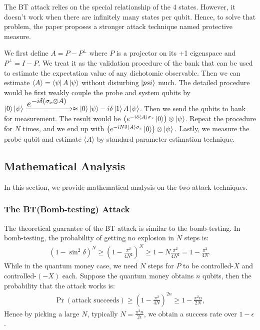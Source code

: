 \documentclass{article} %
\begin{document}
The BT attack relies on the special relationship of the 4 states. However, it doesn't work when there are infinitely many states per qubit. Hence, to solve that problem, the paper proposes a stronger attack technique named protective measure.

We first define $A=P-P^\perp$ where $P$ is a projector on its +1 eigenspace and $P^\perp=I-P$. We treat it as the validation procedure of the bank that can be used to estimate the expectation value of any dichotomic observable. Then we can estimate $\langle A\rangle=\bra{\psi}A\ket{\psi}$ without disturbing $\ket{psi}$ much. The detailed procedure would be first weakly couple the probe and system qubits by $ \ket{0}\ket{\psi}\xrightarrow{\mbox{\Large{$e^{-i\delta \left(\sigma_x\otimes A\right)}$ }}}  \approx 
	\ket{0}\ket{\psi} - i \delta \ket{1} A \ket{\psi}  $. Then we send the qubits to bank for measurement. The result would be $\left(e^{-i\delta \langle A\rangle \sigma_x} \ket{0} \right) \otimes \ket{\psi}$. Repeat the procedure for $N$ times, and we end up with $\left(e^{-iN\delta \langle A\rangle \sigma_x} \ket{0} \right) \otimes \ket{\psi}.$ Lastly, we measure the probe qubit and estimate $\langle A\rangle$ by standard parameter estimation technique.
 
\subsection{Mathematical Analysis}

In this section, we provide mathematical analysis on the two attack techniques.

\subsubsection{The BT(Bomb-testing) Attack}

The theoretical guarantee of the BT attack is similar to the bomb-testing. In bomb-testing, the probability of getting no explosion in $N$ steps is: 
\begin{align}
	 \left(1 - \sin^2 \delta \right)^N 
	\geq %
	\left(1-\frac{\pi^2}{4N^2}\right)^N 
	\geq
	1 - N\frac{\pi^2}{4N^2}
	=1 - \frac{\pi^2}{4N} .  \label{pliveEV}
\end{align}
While in the quantum money case, we need $N$ steps for $P$ to be controlled-$X$ and controlled-$(-X)$ each. Suppose the quantum money obtains $n$ qubits, then the probability that the attack works is:
\begin{align}
	\Pr(\text{attack succeeds}) \geq \left(1-\frac{\pi^2}{4N}\right)^{2n} 
	\geq 1 - \frac{\pi^2 n }{2N},
	\label{attack_succeeds}
\end{align}
Hence by picking a large $N$, typically $N=\frac{\pi^2 n}{2\epsilon}$, we obtain a success rate over $1-\epsilon$.
\end{document}
